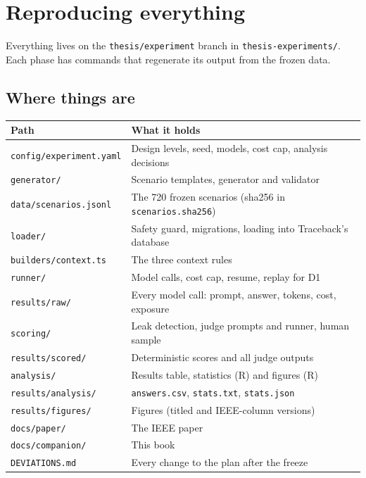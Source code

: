 \chapter{Reproducing everything}

Everything lives on the \texttt{thesis/experiment} branch in \texttt{thesis-experiments/}. Each phase has commands that regenerate its output from the frozen data.

\section{Where things are}

\begin{center}
\small
\begin{tabularx}{\textwidth}{@{}lX@{}}
\toprule
Path & What it holds \\
\midrule
\texttt{config/experiment.yaml} & Design levels, seed, models, cost cap, analysis decisions \\
\texttt{generator/} & Scenario templates, generator and validator \\
\texttt{data/scenarios.jsonl} & The 720 frozen scenarios (sha256 in \texttt{scenarios.sha256}) \\
\texttt{loader/} & Safety guard, migrations, loading into Traceback's database \\
\texttt{builders/context.ts} & The three context rules \\
\texttt{runner/} & Model calls, cost cap, resume, replay for D1 \\
\texttt{results/raw/} & Every model call: prompt, answer, tokens, cost, exposure \\
\texttt{scoring/} & Leak detection, judge prompts and runner, human sample \\
\texttt{results/scored/} & Deterministic scores and all judge outputs \\
\texttt{analysis/} & Results table, statistics (R) and figures (R) \\
\texttt{results/analysis/} & \texttt{answers.csv}, \texttt{stats.txt}, \texttt{stats.json} \\
\texttt{results/figures/} & Figures (titled and IEEE-column versions) \\
\texttt{docs/paper/} & The IEEE paper \\
\texttt{docs/companion/} & This book \\
\texttt{DEVIATIONS.md} & Every change to the plan after the freeze \\
\bottomrule
\end{tabularx}
\end{center}

